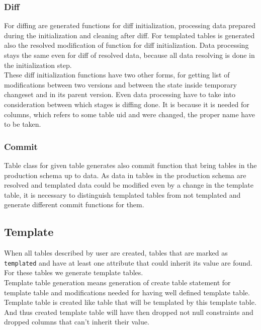 \documentclass[deska]{subfiles}
\begin{document}
\subsubsection{Diff}
For diffing are generated functions for diff initialization, processing data prepared during the initialization and cleaning after diff. For templated tables is generated also the resolved modification of function for diff initialization. Data processing stays the same even for diff of resolved data, because all data resolving is done in the initialization step.\\
These diff initialization functions have two other forms, for getting list of modifications between two versions and between the state inside temporary changeset and in its parent version. Even data processing have to take into consideration between which stages is diffing done. It is because it is needed for columns, which refers to some table uid and were changed, the proper name have to be taken.

\subsubsection{Commit}
Table class for given table generates also commit function that bring tables in the production schema up to data. As data in tables in the production schema are resolved and templated data could be modified even by a change in the template table, it is necessary to distinguish templated tables from not templated and generate different commit functions for them.

\subsection{Template}
When all tables described by user are created, tables that are marked as {\tt templated} and have at least one attribute that could inherit its value are found. For these tables we generate template tables.\\
Template table generation means generation of create table statement for template table and modifications needed for having well defined template table.
Template table is created like table that will be templated by this template table. And thus created template table will have then dropped not null constraints and dropped columns that can't inherit their value.
\end{document}
